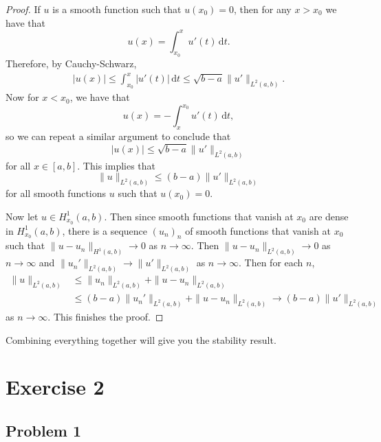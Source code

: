 \documentclass{article}
\theoremstyle{definition}
\theoremstyle{plain}
\renewcommand{\d}{\mathrm d}
\begin{document}
\begin{proof}
    If $u$ is a smooth function such that $u(x_0) = 0$, then for any $x > x_0$ we have that 
    \begin{equation}
        u(x) = \int_{x_0}^xu'(t)\,\d t.
    \end{equation}
   Therefore, by Cauchy-Schwarz,
   \begin{align}
       |u(x)| \leq \int_{x_0}^x|u'(t)|\,\d t \leq \sqrt{b-a}\|u'\|_{L^2(a,b)}.
   \end{align}
   Now for $x < x_0$, we have that
   \begin{equation}
       u(x) = -\int_x^{x_0}u'(t)\,\d t,
   \end{equation}
   so we can repeat a similar argument to conclude that
   \begin{equation}
       |u(x)| \leq \sqrt{b-a}\|u'\|_{L^2(a,b)}
   \end{equation}
   for all $x \in [a,b]$.
   This implies that 
   \begin{equation}
       \|u\|_{L^2(a,b)} \leq (b-a)\|u'\|_{L^2(a,b)}
   \end{equation}
   for all smooth functions $u$ such that $u(x_0) = 0$.
   
   Now let $u \in H^1_{x_0}(a,b)$.
   Then since smooth functions that vanish at $x_0$ are dense in $H^1_{x_0}(a,b)$, there is a sequence $(u_n)_n$ of smooth functions that vanish at $x_0$ such that $\|u-u_n\|_{H^1(a,b)} \to 0$ as $n\to\infty$.
   Then $\|u-u_n\|_{L^2(a,b)} \to 0$ as $n \to \infty$ and $\|u_n'\|_{L^2(a,b)} \to \|u'\|_{L^2(a,b)}$ as $n \to \infty$.
   Then for each $n$,
   \begin{align}
       \|u\|_{L^2(a,b)} & \leq \|u_n\|_{L^2(a,b)} + \|u-u_n\|_{L^2(a,b)} \\ & \leq (b-a)\|u_n'\|_{L^2(a,b)} + \|u-u_n\|_{L^2(a,b)} \to (b-a)\|u'\|_{L^2(a,b)}
   \end{align}
   as $n\to\infty$.
   This finishes the proof.
\end{proof}
Combining everything together will give you the stability result.

\section{Exercise 2}
\subsection{Problem 1}
\end{document}
